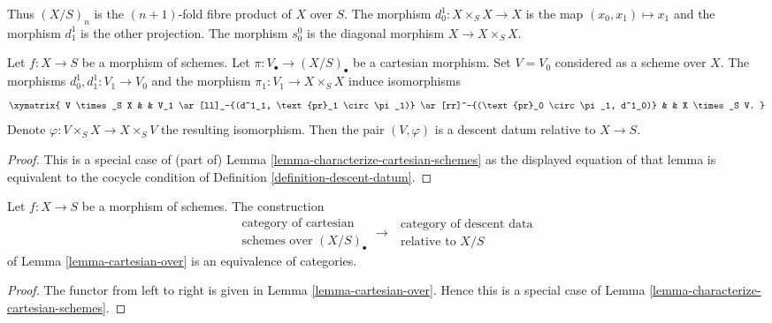 \noindent
Thus $(X/S)_n$ is the $(n + 1)$-fold fibre product of $X$ over $S$.
The morphism $d^1_0 : X \times_S X \to X$ is the map
$(x_0, x_1) \mapsto x_1$ and the morphism $d^1_1$ is the other
projection. The morphism $s^0_0$ is the diagonal morphism
$X \to X \times_S X$.

\begin{lemma}
\label{lemma-cartesian-over}
Let $f : X \to S$ be a morphism of schemes.
Let $\pi : V_\bullet \to (X/S)_\bullet$ be a cartesian morphism.
Set $V = V_0$ considered as a scheme over $X$.
The morphisms $d^1_0, d^1_1 : V_1 \to V_0$ and the morphism
$\pi_1 : V_1 \to X \times_S X$ induce isomorphisms
$$
\xymatrix{
V \times_S X & &
V_1 \ar[ll]_-{(d^1_1, \text{pr}_1 \circ \pi_1)}
\ar[rr]^-{(\text{pr}_0 \circ \pi_1, d^1_0)} & &
X \times_S V.
}
$$
Denote $\varphi : V \times_S X \to X \times_S V$ the
resulting isomorphism.
Then the pair $(V, \varphi)$ is a descent datum relative
to $X \to S$.
\end{lemma}

\begin{proof}
This is a special case of (part of)
Lemma \ref{lemma-characterize-cartesian-schemes}
as the displayed equation of that lemma is
equivalent to the cocycle condition of
Definition \ref{definition-descent-datum}.
\end{proof}

\begin{lemma}
\label{lemma-cartesian-equivalent-descent-datum}
Let $f : X \to S$ be a morphism of schemes. The construction
$$
\begin{matrix}
\text{category of cartesian } \\
\text{schemes over } (X/S)_\bullet
\end{matrix}
\longrightarrow
\begin{matrix}
\text{ category of descent data} \\
\text{ relative to } X/S
\end{matrix}
$$
of Lemma \ref{lemma-cartesian-over}
is an equivalence of categories.
\end{lemma}

\begin{proof}
The functor from left to right is given in
Lemma \ref{lemma-cartesian-over}.
Hence this is a special case of
Lemma \ref{lemma-characterize-cartesian-schemes}.
\end{proof}

